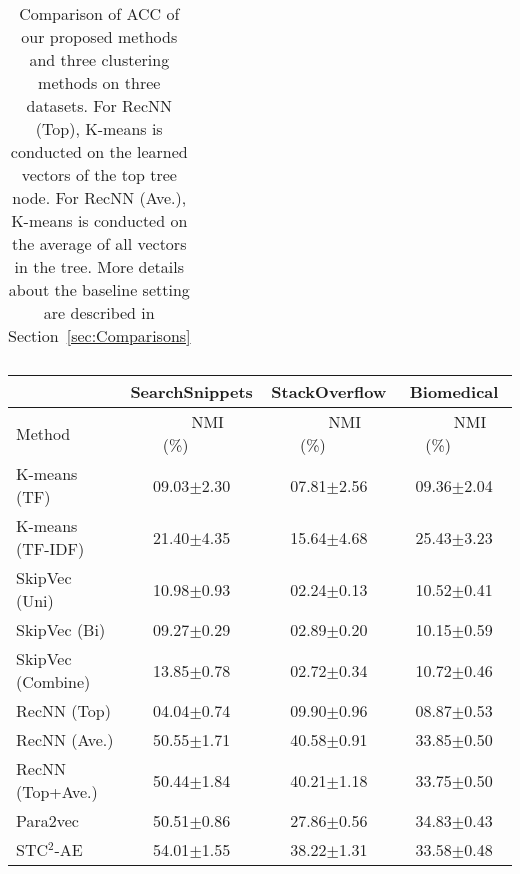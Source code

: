 \documentclass[review]{elsarticle}
\begin{document}
\begin{table*}[t]
\begin{center}
\begin{tabular}{|l|c|c|c|}
\end{tabular}
\end{center}
\caption{\label{tb:Comparison} Comparison of ACC of our proposed methods and three clustering methods on three datasets. For RecNN (Top), K-means is conducted on the learned vectors of the top tree node. For RecNN (Ave.), K-means is conducted on the average of all vectors in the tree. More details about the baseline setting are described in Section~\ref{sec:Comparisons}}
\end{table*}

\begin{table*}[t] %
\begin{center}
\begin{tabular}{|l|c|c|c|}\hline
&SearchSnippets &StackOverflow &Biomedical\\\hline
Method      &~~~~NMI (\%)~~~~&~~~~NMI (\%)~~~~&~~~~NMI (\%)~~~~\\\hline \hline
K-means (TF)   &	09.03$\pm$2.30    & 07.81$\pm$2.56  &09.36$\pm$2.04    \\
K-means (TF-IDF)   &	21.40$\pm$4.35    & 15.64$\pm$4.68   &25.43$\pm$3.23 \\
SkipVec (Uni) & 10.98$\pm$0.93           & 02.24$\pm$0.13  & 10.52$\pm$0.41 \\
SkipVec (Bi)  & 09.27$\pm$0.29           & 02.89$\pm$0.20  & 10.15$\pm$0.59 \\
SkipVec (Combine)  & 13.85$\pm$0.78      & 02.72$\pm$0.34  & 10.72$\pm$0.46 \\
RecNN (Top) 	&04.04$\pm$0.74		&09.90$\pm$0.96   &08.87$\pm$0.53\\
RecNN (Ave.) 	&50.55$\pm$1.71		&40.58$\pm$0.91   &33.85$\pm$0.50\\
RecNN (Top+Ave.) &50.44$\pm$1.84	&40.21$\pm$1.18   &33.75$\pm$0.50\\
Para2vec & 50.51$\pm$0.86	&27.86$\pm$0.56	  &34.83$\pm$0.43\\
\hline
STC$^2$-AE&	54.01$\pm$1.55 & 38.22$\pm$1.31 &33.58$\pm$0.48\\

\end{tabular}
\end{center}
\end{table*}
\end{document}
